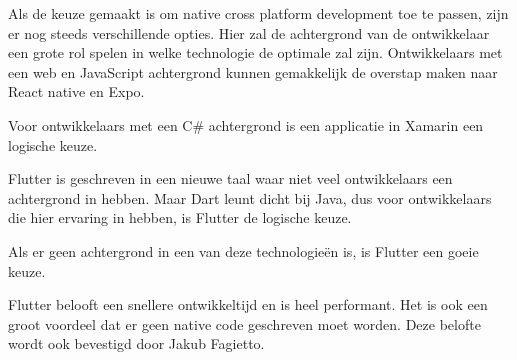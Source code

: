 Als de keuze gemaakt is om native cross platform development toe te passen, zijn er nog steeds verschillende opties. Hier zal de achtergrond van de ontwikkelaar een grote rol spelen in welke technologie de optimale zal zijn. Ontwikkelaars met een web en JavaScript achtergrond kunnen gemakkelijk de overstap maken naar React native en Expo. 

Voor ontwikkelaars met een C\# achtergrond is een applicatie in Xamarin een logische keuze. 

Flutter is geschreven in een nieuwe taal waar niet veel ontwikkelaars een achtergrond in hebben. Maar Dart leunt dicht bij Java, dus voor ontwikkelaars die hier ervaring in hebben, is Flutter de logische keuze.

Als er geen achtergrond in een van deze technologieën is, is Flutter een goeie keuze.
\autocite{Leler2017}
\autocite{Wenhao2018}

Flutter belooft een snellere ontwikkeltijd en is heel performant. Het is ook een groot voordeel dat er geen native code geschreven moet worden.
Deze belofte wordt ook bevestigd door Jakub Fagietto.
\autocite{Fagietto2019}


